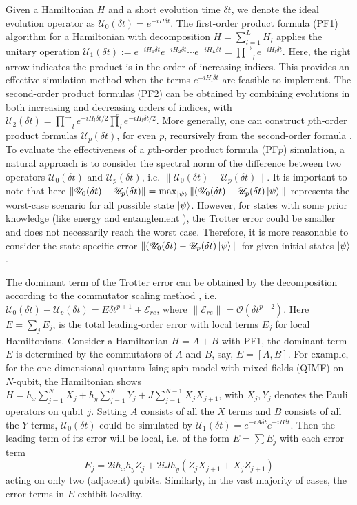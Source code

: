 \documentclass[showpacs,amsmath,amssymb,twocolumn,aps,pra,superscriptaddress,notitlepage,10pt]{revtex4-2}
\newcommand{\cO}{\mathcal O}
\newcommand{\sE}{\mathscr E}
\newcommand{\sU}{\mathscr U}
\begin{document}
Given a Hamiltonian $H$ and a short evolution time $\delta t$, we denote the ideal evolution operator as $\sU_0(\delta t)=e^{-iH\delta t}$. The first-order product formula (PF1) algorithm for a Hamiltonian with decomposition $H=\sum_{l=1}^L H_l$ applies the unitary operation $\sU_1(\delta t):=e^{-iH_1\delta t}e^{-iH_2\delta t}\cdots e^{-iH_L\delta t}=\overrightarrow\prod_le^{-iH_l\delta t}$. Here, the right arrow indicates the product is in the order of increasing indices. This provides an effective simulation method when the terms $e^{-iH_l\delta t}$ are feasible to implement. The second-order product formulas (PF2) can be obtained by combining evolutions in both increasing and decreasing orders of indices, with $\sU_2(\delta t)=\overrightarrow\prod_le^{-iH_l\delta t/2}\overleftarrow\prod_le^{-iH_l\delta t/2}$. More generally, one can construct $p$th-order product formulas $\sU_p(\delta t)$, for even $p$, recursively from the second-order formula \cite{yoshida_construction_1990,suzuki1991general,Morales_2025}.
To evaluate the effectiveness of a $p$th-order product formula (PF$p$) simulation, a natural approach is to consider the spectral norm of the difference between two operators $\sU_0(\delta t)$ and $\sU_p(\delta t)$, i.e.  $\|\sU_0(\delta t)-\sU_p(\delta t)\|$. It is important to note that here $\|\sU_0(\delta t)-\sU_p(\delta t)\|=\max _{\ket{\psi}}\|(\sU_0(\delta t)-\sU_p(\delta t)\ket{\psi}\|$ represents the worst-case scenario for all possible state $\ket{\psi}$. However, for states with some prior knowledge (like energy \cite{Gong2024complexityofdigital,csahinouglu2021hamiltonian,Mizuta2025Trotterization} and entanglement \cite{zhao2024entanglementacceleratesquantumsimulation}), the Trotter error could be smaller and does not necessarily reach the worst case.
Therefore, it is more reasonable to consider the state-specific error $\|(\sU_0(\delta t)-\sU_p(\delta t)\ket{\psi}\|$ for given initial states $\ket{\psi}$.

The dominant term of the Trotter error can be obtained by the decomposition according to the commutator scaling method \cite{childs2021theory}, i.e.  $\sU_0(\delta t)-\sU_p(\delta t)=E\delta t^{p+1}+\sE_{re}$, where $\|\sE_{re}\|=\cO(\delta t^{p+2})$. Here $E=\sum_j E_j$, is the total leading-order error with local terms $E_j$ for local Hamiltonians. Consider a Hamiltonian $H=A+B$ with PF1, the dominant term $E$ is determined by the commutators of $A$ and $B$, say, $E=[A,B]$. For example, for the one-dimensional quantum Ising spin model with mixed fields (QIMF) on $N$-qubit, the Hamiltonian shows $H=h_x\sum_{j=1}^N X_j+h_y\sum_{j=1}^NY_j+J\sum_{j=1}^{N-1}X_jX_{j+1}$, with $X_j,Y_j$ denotes the Pauli operators on qubit $j$.
Setting $A$ consists of all the $X$ terms and $B$ consists of all the $Y$ terms, $\sU_0(\delta t)$ could be simulated by $\sU_1(\delta t)=e^{-iA\delta t}e^{-iB\delta t}$. Then the leading term of its error will be local, i.e.  of the form $E=\sum E_j$ with each error term
\begin{equation}
    E_j=2ih_xh_yZ_j+2iJh_y(Z_jX_{j+1}+X_jZ_{j+1})\label{equ: Ej}
\end{equation}
acting on only two (adjacent) qubits. Similarly, in the vast majority of cases, the error terms in $E$ exhibit locality.
\end{document}
